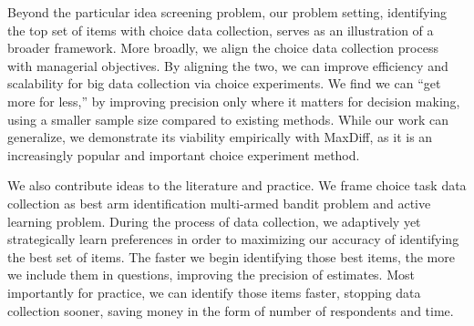 \documentclass[a4paper,12pt]{article}
\begin{document}
Beyond the particular idea screening problem, our problem setting, identifying the top set of items with choice data collection, serves as an illustration of a broader framework. More broadly, we align the choice data collection process with managerial objectives. By aligning the two, we can improve efficiency and scalability for big data collection via choice experiments. We find we can ``get more for less,'' by improving precision only where it matters for decision making, using a smaller sample size compared to existing methods. While our work can generalize, we demonstrate its viability empirically with MaxDiff, as it is an increasingly popular and important choice experiment method. 

We also contribute ideas to the literature and practice. We frame choice task data collection as best arm identification multi-armed bandit problem and active learning problem. During the process of data collection, we adaptively yet strategically learn preferences in order to maximizing our accuracy of identifying the best set of items. The faster we begin identifying those best items, the more we include them in questions, improving the precision of estimates. Most importantly for practice, we can identify those items faster, stopping data collection sooner, saving money in the form of number of respondents and time. 
\end{document}
